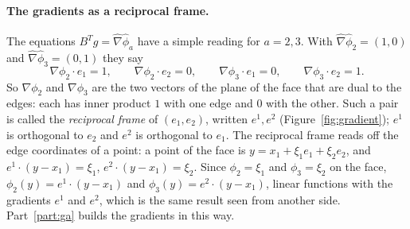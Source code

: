 \paragraph{The gradients as a reciprocal frame.} The equations $B^T g = \hat\nabla\hat\phi_a$ have a simple reading for $a = 2, 3$. With $\hat\nabla\hat\phi_2 = (1, 0)$ and $\hat\nabla\hat\phi_3 = (0, 1)$ they say
\begin{equation*}
\nabla\phi_2\cdot e_1 = 1, \qquad \nabla\phi_2\cdot e_2 = 0, \qquad \nabla\phi_3\cdot e_1 = 0, \qquad \nabla\phi_3\cdot e_2 = 1 .
\end{equation*}
So $\nabla\phi_2$ and $\nabla\phi_3$ are the two vectors of the plane of the face that are dual to the edges: each has inner product $1$ with one edge and $0$ with the other. Such a pair is called the \emph{reciprocal frame} of $(e_1, e_2)$, written $e^1, e^2$ (Figure~\ref{fig:gradient}); $e^1$ is orthogonal to $e_2$ and $e^2$ is orthogonal to $e_1$. The reciprocal frame reads off the edge coordinates of a point: a point of the face is $y = x_1 + \xi_1 e_1 + \xi_2 e_2$, and $e^1\cdot(y - x_1) = \xi_1$, $e^2 \cdot (y - x_1) = \xi_2$. Since $\phi_2 = \xi_1$ and $\phi_3 = \xi_2$ on the face, $\phi_2(y) = e^1\cdot(y - x_1)$ and $\phi_3(y) = e^2\cdot(y - x_1)$, linear functions with the gradients $e^1$ and $e^2$, which is the same result seen from another side. Part~\ref{part:ga} builds the gradients in this way.

